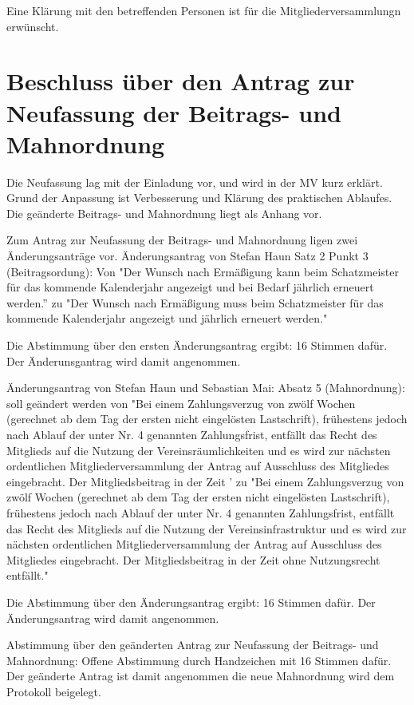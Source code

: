 \documentclass[a4paper,12pt,titlepage]{scrartcl}
\begin{document}
Eine Klärung mit den betreffenden Personen ist für die Mitgliederversammlungn erwünscht.


\section{Beschluss über den Antrag zur Neufassung der Beitrags- und Mahnordnung}

Die Neufassung lag mit der Einladung vor, und wird in der MV kurz erklärt. Grund der Anpassung ist Verbesserung und Klärung des praktischen Ablaufes. Die geänderte Beitrags- und Mahnordnung liegt als Anhang vor.
 
Zum Antrag zur Neufassung der Beitrags- und Mahnordnung ligen zwei Änderungsanträge vor.
Änderungsantrag von Stefan Haun Satz 2 Punkt 3 (Beitragsordung): Von 
"Der Wunsch nach Ermäßigung kann beim Schatzmeister für das
kommende Kalenderjahr angezeigt und bei Bedarf jährlich erneuert werden.'' zu 
"Der Wunsch nach Ermäßigung muss beim Schatzmeister für das
kommende Kalenderjahr angezeigt und jährlich erneuert werden."

Die Abstimmung über den ersten Änderungsantrag ergibt: 16 Stimmen dafür. Der Änderunsgantrag wird damit angenommen.

Änderungsantrag von Stefan Haun und Sebastian Mai: 
Absatz 5 (Mahnordnung): soll geändert werden von 
"Bei einem Zahlungsverzug von zwölf Wochen (gerechnet ab dem Tag der ersten nicht
eingelösten Lastschrift), frühestens jedoch nach Ablauf der unter Nr. 4 genannten
Zahlungsfrist, entfällt das Recht des Mitglieds auf die Nutzung der
Vereinsräumlichkeiten und es wird zur nächsten ordentlichen Mitgliederversammlung
der Antrag auf Ausschluss des Mitgliedes eingebracht. Der Mitgliedsbeitrag in der Zeit
' zu 
"Bei einem Zahlungsverzug von zwölf Wochen (gerechnet ab dem Tag der ersten nicht
eingelösten Lastschrift), frühestens jedoch nach Ablauf der unter Nr. 4 genannten
Zahlungsfrist, entfällt das Recht des Mitglieds auf die Nutzung der
Vereinsinfrastruktur und es wird zur nächsten ordentlichen Mitgliederversammlung
der Antrag auf Ausschluss des Mitgliedes eingebracht. Der Mitgliedsbeitrag in der Zeit ohne Nutzungsrecht entfällt."


Die Abstimmung über den Änderungsantrag ergibt: 16 Stimmen dafür. Der Änderungsantrag wird damit angenommen.


Abstimmung über den geänderten Antrag zur Neufassung der Beitrags- und Mahnordnung: Offene Abstimmung durch Handzeichen mit 16 Stimmen dafür. Der geänderte Antrag ist damit angenommen die neue Mahnordnung wird dem Protokoll beigelegt.
\end{document}

